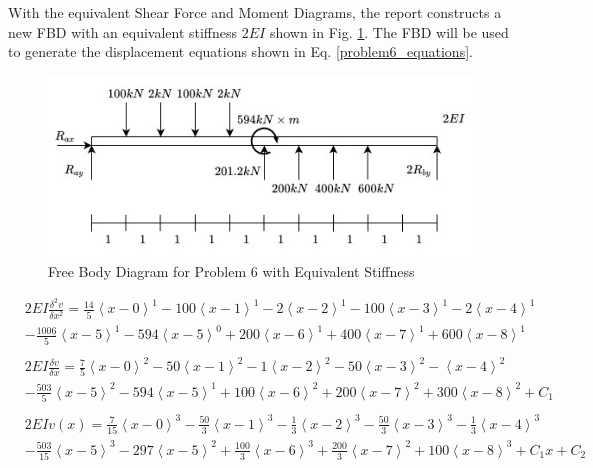 \documentclass[a4paper]{article}
\begin{document}
With the equivalent Shear Force and Moment Diagrams, the report constructs a new FBD with an equivalent stiffness $2EI$ shown in Fig. \ref{FBD_6_new}. The FBD will be used to generate the displacement equations shown in Eq. \ref{problem6_equations}.

\begin{figure}[h]
\includegraphics[width=\textwidth]{FBD/FBD_6_new.jpg}
\caption{Free Body Diagram for Problem 6 with Equivalent Stiffness}
\label{FBD_6_new}
\end{figure}

\begin{equation}
    \begin{split}
& 2EI \frac{\delta^2 v}{\delta x^2} = \frac{14}{5}\left<x-0\right>^1 - 100\left<x-1\right>^1 -  2\left<x-2\right>^1 - 100\left<x-3\right>^1 - 2\left<x-4\right>^1 \\
& - \frac{1006}{5}\left<x-5\right>^1 - 594\left<x-5\right>^0 + 200\left<x-6\right>^1 + 400\left<x-7\right>^1 + 600\left<x-8\right>^1 \\
& \\
& 2EI \frac{\delta v}{\delta x} = \frac{7}{5}\left<x-0\right>^2 - 50\left<x-1\right>^2 -  1\left<x-2\right>^2 - 50\left<x-3\right>^2 - \left<x-4\right>^2 \\
& - \frac{503}{5}\left<x-5\right>^2 - 594\left<x-5\right>^1 + 100\left<x-6\right>^2 + 200\left<x-7\right>^2 + 300\left<x-8\right>^2 + C_1 \\
& \\
& 2EI v(x) = \frac{7}{15}\left<x-0\right>^3 - \frac{50}{3}\left<x-1\right>^3 -  \frac{1}{3}\left<x-2\right>^3 - \frac{50}{3}\left<x-3\right>^3 - \frac{1}{3}\left<x-4\right>^3 \\
& - \frac{503}{15}\left<x-5\right>^3 - 297\left<x-5\right>^2 + \frac{100}{3}\left<x-6\right>^3 + \frac{200}{3}\left<x-7\right>^2 + 100\left<x-8\right>^3 + C_1x + C_2\\
    \end{split}
\label{problem6_equations}
\end{equation}
\end{document}

